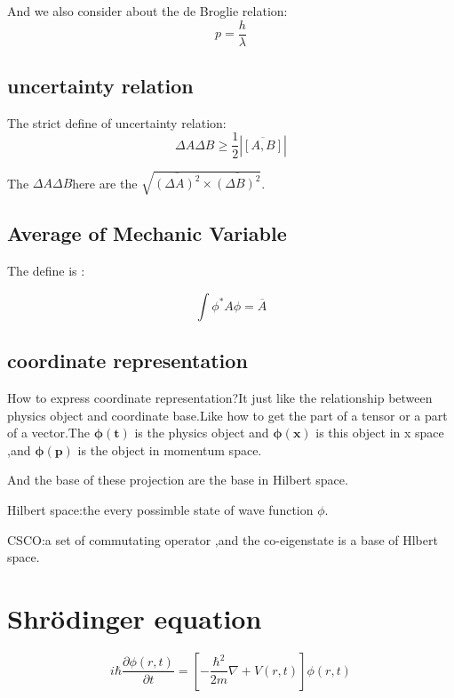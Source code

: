 \documentclass{article}
\begin{document}
And we also consider about the de Broglie relation:
\begin{equation}
  p=\frac{h}{\lambda} 
\end{equation}
\subsection{uncertainty relation}

The strict define of uncertainty relation:
\begin{equation}
  \Delta A\Delta B\ge\frac12|\overline{[A,B]}|
\end{equation}

The $\Delta A\Delta B$here are the $\sqrt{\overline{(\Delta A)^2}\times\overline{(\Delta B)^2}}$.

\subsection{Average of Mechanic Variable}

The define is :

\begin{equation}
\int \phi^* A \phi=\overline A
  \end{equation}
\subsection{coordinate representation}

How to express coordinate representation?It just like the relationship between physics object and coordinate base.Like how to get the part of a tensor or a part of a vector.The $\bm{\phi(t)}$ is the physics object and $\bm{\phi(x)}$ is this object in x space ,and $\bm{\phi(p)}$ is the object in momentum space. 

And the base of these projection are the base in Hilbert space.

Hilbert space:the every possimble state of wave function $\phi$.

CSCO:a set of commutating operator ,and the co-eigenstate is a base of Hlbert space. 

  \section{Shr\"odinger equation}

  \begin{equation}
    i\hbar\frac{ \partial \phi(r,t)}{ \partial t}=[-\frac{\hbar^2}{2m}\nabla+V(r,t)]\phi(r,t)
  \end{equation}
\end{document}
